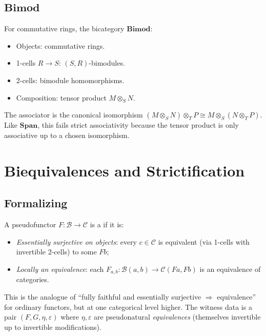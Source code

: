 \subsection{$\mathbf{Bimod}$}

For commutative rings, the bicategory $\mathbf{Bimod}$:
\begin{itemize}
  \item Objects: commutative rings.
  \item 1-cells $R \to S$: $(S, R)$-bimodules.
  \item 2-cells: bimodule homomorphisms.
  \item Composition: tensor product $M \otimes_S N$.
\end{itemize}

The associator is the canonical isomorphism $(M \otimes_S N) \otimes_T P
\cong M \otimes_S (N \otimes_T P)$. Like $\mathbf{Span}$, this fails strict
associativity because the tensor product is only associative up to a chosen
isomorphism.


\section{Biequivalences and Strictification}
\label{sec:strictification}

\subsection{Formalizing}

\begin{definition}[Biequivalence]
A pseudofunctor $F : \mathcal{B} \to \mathcal{C}$ is a 
if it is:
\begin{itemize}
  \item \emph{Essentially surjective on objects}: every $c \in \mathcal{C}$
        is equivalent (via 1-cells with invertible 2-cells) to some $Fb$;
  \item \emph{Locally an equivalence}: each $F_{a,b} : \mathcal{B}(a,b) \to
        \mathcal{C}(Fa, Fb)$ is an equivalence of categories.
\end{itemize}
\end{definition}

\begin{remark}
This is the analogue of ``fully faithful and essentially surjective $\Rightarrow$
equivalence'' for ordinary functors, but at one categorical level higher. The
witness data is a pair $(F, G, \eta, \varepsilon)$ where $\eta, \varepsilon$
are pseudonatural \emph{equivalences} (themselves invertible up to invertible
modifications).
\end{remark}

